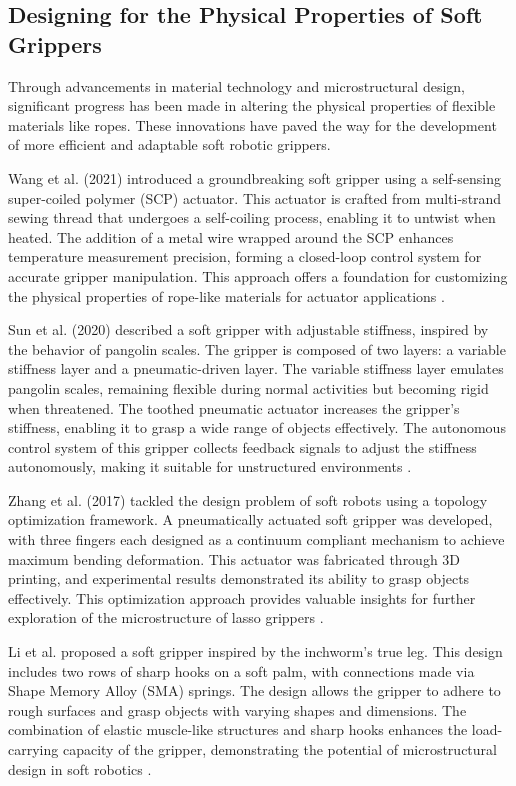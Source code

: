 \subsection{Designing for the Physical Properties of Soft Grippers}

Through advancements in material technology and microstructural design, significant progress has been made in altering the physical properties of flexible materials like ropes. These innovations have paved the way for the development of more efficient and adaptable soft robotic grippers.

Wang et al. (2021) introduced a groundbreaking soft gripper using a self-sensing super-coiled polymer (SCP) actuator. This actuator is crafted from multi-strand sewing thread that undergoes a self-coiling process, enabling it to untwist when heated. The addition of a metal wire wrapped around the SCP enhances temperature measurement precision, forming a closed-loop control system for accurate gripper manipulation. This approach offers a foundation for customizing the physical properties of rope-like materials for actuator applications \cite{wang2021lightweight}.

Sun et al. (2020) described a soft gripper with adjustable stiffness, inspired by the behavior of pangolin scales. The gripper is composed of two layers: a variable stiffness layer and a pneumatic-driven layer. The variable stiffness layer emulates pangolin scales, remaining flexible during normal activities but becoming rigid when threatened. The toothed pneumatic actuator increases the gripper's stiffness, enabling it to grasp a wide range of objects effectively. The autonomous control system of this gripper collects feedback signals to adjust the stiffness autonomously, making it suitable for unstructured environments \cite{sun2020soft}.

Zhang et al. (2017) tackled the design problem of soft robots using a topology optimization framework. A pneumatically actuated soft gripper was developed, with three fingers each designed as a continuum compliant mechanism to achieve maximum bending deformation. This actuator was fabricated through 3D printing, and experimental results demonstrated its ability to grasp objects effectively. This optimization approach provides valuable insights for further exploration of the microstructure of lasso grippers \cite{zhang2017design}.

Li et al. proposed a soft gripper inspired by the inchworm's true leg. This design includes two rows of sharp hooks on a soft palm, with connections made via Shape Memory Alloy (SMA) springs. The design allows the gripper to adhere to rough surfaces and grasp objects with varying shapes and dimensions. The combination of elastic muscle-like structures and sharp hooks enhances the load-carrying capacity of the gripper, demonstrating the potential of microstructural design in soft robotics \cite{li2017development}.

